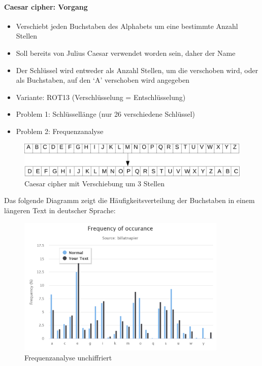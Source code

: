 \documentclass[10pt,a4paper]{article}
\begin{document}
\paragraph*{Caesar cipher: Vorgang}
\begin{itemize}[noitemsep,topsep=0pt,leftmargin=*]
    \item Verschiebt jeden Buchstaben des Alphabets um eine bestimmte Anzahl Stellen
    \item Soll bereits von Julius Caesar verwendet worden sein, daher der Name
    \item Der Schlüssel wird entweder als Anzahl Stellen, um die verschoben wird, oder als Buchstaben, auf den `A' verschoben wird angegeben
    \item Variante: ROT13 (Verschlüsselung = Entschlüsselung)
    \item Problem 1: Schlüssellänge (nur 26 verschiedene Schlüssel)
    \item Problem 2: Frequenzanalyse
\end{itemize}
\begin{figure}[H]
    \begin{center}
    \includegraphics[width=12cm]{images/caesar.png}
    \caption{Caesar cipher mit Verschiebung um 3 Stellen}
    \label{caesar}
    \end{center}
\end{figure}

\noindent
Das folgende Diagramm zeigt die Häufigkeitsverteilung der Buchstaben in einem längeren Text in deutscher Sprache:
\begin{figure}[H]
    \begin{center}
    \includegraphics[width=10cm]{images/frequency0.png}
    \caption{Frequenzanalyse unchiffriert}
    \label{frequencynormal}
    \end{center}
\end{figure}
\end{document}
